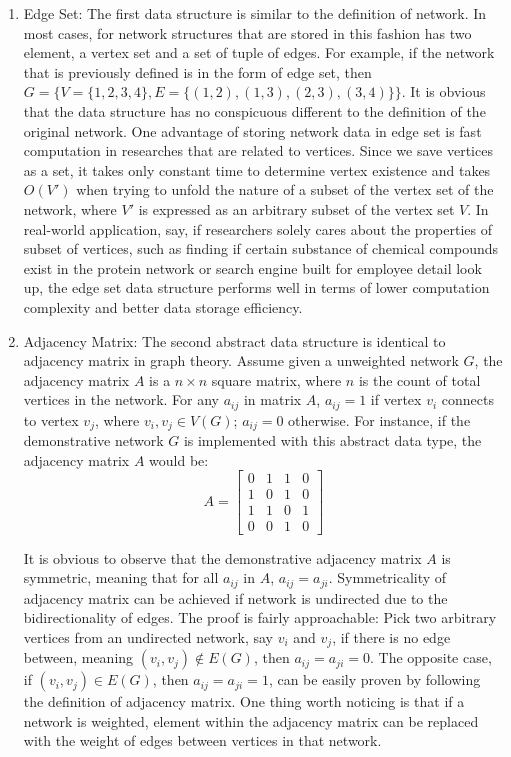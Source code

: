 \documentclass[12pt]{article}
\begin{document}
\begin{enumerate}[label=(\roman*)]
\item Edge Set: The first data structure is similar to the definition of network. In most cases, for network structures that are stored in this fashion has two element, a vertex set and a set of tuple of edges. For example, if the network that is previously defined is in the form of edge set, then $G = \{ V=\{1,2,3,4\}, E=\{(1,2),(1,3),(2,3),(3,4)\}\}$. It is obvious that the data structure has no conspicuous different to the definition of the original network. One advantage of storing network data in edge set is fast computation in researches that are related to vertices. Since we save vertices as a set, it takes only constant time to determine vertex existence and takes $O(V')$ when trying to unfold the nature of a subset of the vertex set of the network, where $V'$ is expressed as an arbitrary subset of the vertex set $V$. In real-world application, say, if researchers solely cares about the properties of subset of vertices, such as finding if certain substance of chemical compounds exist in the protein network or search engine built for employee detail look up, the edge set data structure performs well in terms of lower computation complexity and better data storage efficiency.
\item Adjacency Matrix: The second abstract data structure is identical to adjacency matrix in graph theory.  Assume given a unweighted network $G$, the adjacency matrix $A$ is a $n \times n$ square matrix, where $n$ is the count of total vertices in the network. For any $a_{ij}$ in matrix $A$, $a_{ij}=1$ if vertex $v_i$ connects to vertex $v_j$, where $v_i, v_j \in V(G)$; $a_{ij}=0$ otherwise. For instance, if the demonstrative network $G$ is implemented with this abstract data type, the adjacency matrix $A$ would be:
$$A = \begin{bmatrix}
0 & 1 & 1 & 0\\
1 & 0 & 1 & 0\\
1 & 1 & 0 & 1\\
0 & 0 & 1 & 0
\end{bmatrix}$$

It is obvious to observe that the demonstrative adjacency matrix $A$ is symmetric, meaning that for all $a_{ij}$ in $A$, $a_{ij} = a_{ji}$. Symmetricality of adjacency matrix can be achieved if network is undirected due to the bidirectionality of edges. The proof is fairly approachable: Pick two arbitrary vertices from an undirected network, say $v_i$ and $v_j$, if there is no edge between, meaning $(v_i, v_j) \notin E(G)$, then $a_{ij} = a_{ji} = 0$. The opposite case, if $(v_i, v_j) \in E(G)$, then $a_{ij} = a_{ji} = 1$, can be easily proven by following the definition of adjacency matrix. One thing worth noticing is that if a network is weighted, element within the adjacency matrix can be replaced with the weight of edges between vertices in that network.


\end{enumerate}
\end{document}
